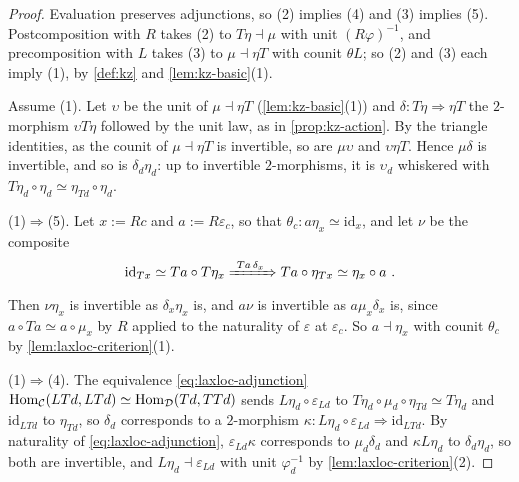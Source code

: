 \begin{proof}
%
Evaluation preserves adjunctions, so (2) implies (4) and (3) implies (5).
Postcomposition with $R$ takes (2) to
$T\eta \dashv \mu$
with unit $(R\varphi)^{-1}$, and precomposition with $L$ takes (3) to
$\mu \dashv \eta T$
with counit $\theta L$; so (2) and (3) each imply (1), by \cref{def:kz} and
\cref{lem:kz-basic}(1).

Assume (1). Let $\upsilon$ be the unit of
$\mu \dashv \eta T$
(\cref{lem:kz-basic}(1)) and
$\delta\colon T\eta \Rightarrow \eta T$
the $2$-morphism $\upsilon T\eta$ followed by the unit law, as in
\cref{prop:kz-action}. By the triangle identities, as the counit of
$\mu \dashv \eta T$
is invertible, so are $\mu\upsilon$ and $\upsilon\eta T$. Hence $\mu\delta$ is
invertible, and so is $\delta_{d}\eta_{d}$: up to invertible $2$-morphisms, it
is $\upsilon_{d}$ whiskered with
$T\eta_{d} \circ \eta_{d} \simeq \eta_{Td} \circ \eta_{d}$.

(1)$\Rightarrow$(5). Let $x := Rc$ and
$a := R\varepsilon_{c}$,
so that
$\theta_{c}\colon a\eta_{x} \simeq \mathrm{id}_{x}$,
and let $\nu$ be the composite
\begin{equation*}
\mathrm{id}_{Tx} \simeq Ta \circ T\eta_{x} \xRightarrow{\ Ta\,\delta_{x}\ } Ta
\circ \eta_{Tx} \simeq \eta_{x} \circ a \ .
\end{equation*}
Then $\nu\eta_{x}$ is invertible as $\delta_{x}\eta_{x}$ is, and $a\nu$ is
invertible as $a\mu_{x}\delta_{x}$ is, since
$a \circ Ta \simeq a \circ \mu_{x}$
by $R$ applied to the naturality of $\varepsilon$ at $\varepsilon_{c}$.
So $a \dashv \eta_{x}$ with counit $\theta_{c}$ by
\cref{lem:laxloc-criterion}(1).

(1)$\Rightarrow$(4). The equivalence \eqref{eq:laxloc-adjunction}
$\operatorname{Hom}_{\mathcal{C}}(LTd,LTd) \simeq \operatorname{Hom}_{\mathcal{D}}(Td,TTd)$
sends
$L\eta_{d} \circ \varepsilon_{Ld}$
to
$T\eta_{d} \circ \mu_{d} \circ \eta_{Td} \simeq T\eta_{d}$
and $\mathrm{id}_{LTd}$ to $\eta_{Td}$, so $\delta_{d}$ corresponds to a
$2$-morphism
$\kappa\colon L\eta_{d} \circ \varepsilon_{Ld} \Rightarrow \mathrm{id}_{LTd}$.
By naturality of \eqref{eq:laxloc-adjunction},
$\varepsilon_{Ld}\kappa$
corresponds to $\mu_{d}\delta_{d}$ and $\kappa L\eta_{d}$ to
$\delta_{d}\eta_{d}$, so both are invertible, and
$L\eta_{d} \dashv \varepsilon_{Ld}$
with unit $\varphi_{d}^{-1}$ by \cref{lem:laxloc-criterion}(2).


\end{proof}
